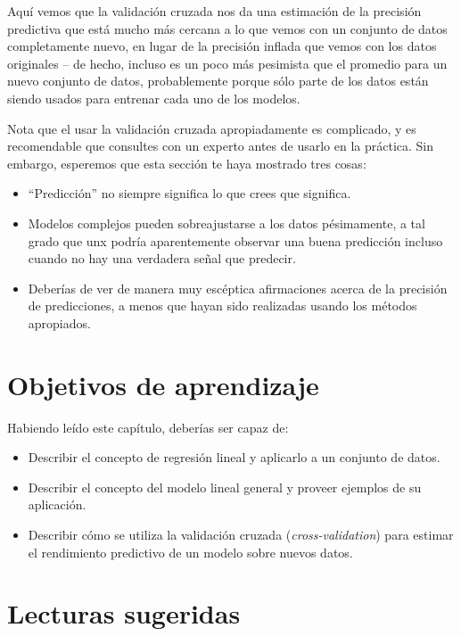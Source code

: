 \documentclass[
  12pt,
]{book}
\providecommand{\tightlist}{%
  \setlength{\itemsep}{0pt}\setlength{\parskip}{0pt}}
\theoremstyle{definition}
\theoremstyle{definition}
\theoremstyle{definition}
\theoremstyle{remark}
\begin{document}
Aquí vemos que la validación cruzada nos da una estimación de la precisión predictiva que está mucho más cercana a lo que vemos con un conjunto de datos completamente nuevo, en lugar de la precisión inflada que vemos con los datos originales -- de hecho, incluso es un poco más pesimista que el promedio para un nuevo conjunto de datos, probablemente porque sólo parte de los datos están siendo usados para entrenar cada uno de los modelos.

Nota que el usar la validación cruzada apropiadamente es complicado, y es recomendable que consultes con un experto antes de usarlo en la práctica. Sin embargo, esperemos que esta sección te haya mostrado tres cosas:

\begin{itemize}
\tightlist
\item
  ``Predicción'' no siempre significa lo que crees que significa.
\item
  Modelos complejos pueden sobreajustarse a los datos pésimamente, a tal grado que unx podría aparentemente observar una buena predicción incluso cuando no hay una verdadera señal que predecir.
\item
  Deberías de ver de manera muy escéptica afirmaciones acerca de la precisión de predicciones, a menos que hayan sido realizadas usando los métodos apropiados.
\end{itemize}

\hypertarget{objetivos-de-aprendizaje}{%
\section{Objetivos de aprendizaje}\label{objetivos-de-aprendizaje}}

Habiendo leído este capítulo, deberías ser capaz de:

\begin{itemize}
\tightlist
\item
  Describir el concepto de regresión lineal y aplicarlo a un conjunto de datos.
\item
  Describir el concepto del modelo lineal general y proveer ejemplos de su aplicación.
\item
  Describir cómo se utiliza la validación cruzada (\emph{cross-validation}) para estimar el rendimiento predictivo de un modelo sobre nuevos datos.
\end{itemize}

\hypertarget{lecturas-sugeridas}{%
\section{Lecturas sugeridas}\label{lecturas-sugeridas}}
\end{document}
